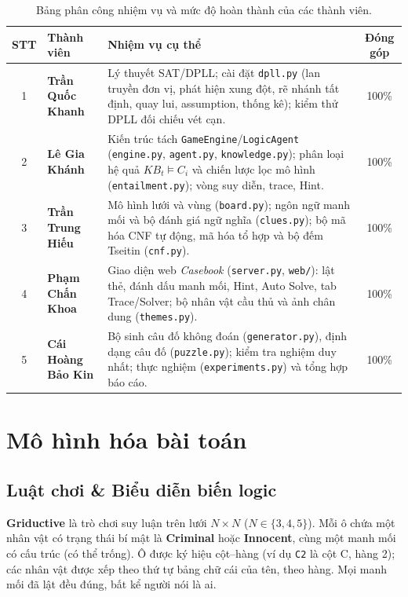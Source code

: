 \documentclass{article}
\newcommand{\code}[1]{\texttt{#1}}
\newcommand{\KB}{\mathit{KB}}
\begin{document}
\begin{table}[H]
\centering
\small
\renewcommand{\arraystretch}{1.3}
\begin{tabularx}{\textwidth}{|c|l|>{\raggedright\arraybackslash}X|c|}
\hline
\rowcolor{gray!20}
\textbf{STT} & \textbf{Thành viên} & \textbf{Nhiệm vụ cụ thể} & \textbf{Đóng góp} \\
\hline
1 & \textbf{Trần Quốc Khanh} & Lý thuyết SAT/DPLL; cài đặt \code{dpll.py} (lan truyền đơn vị, phát hiện xung đột, rẽ nhánh tất định, quay lui, assumption, thống kê); kiểm thử DPLL đối chiếu vét cạn. & 100\% \\
\hline
2 & \textbf{Lê Gia Khánh} & Kiến trúc tách \code{GameEngine}/\code{LogicAgent} (\code{engine.py}, \code{agent.py}, \code{knowledge.py}); phân loại hệ quả $\KB_t \models C_i$ và chiến lược lọc mô hình (\code{entailment.py}); vòng suy diễn, trace, Hint. & 100\% \\
\hline
3 & \textbf{Trần Trung Hiếu} & Mô hình lưới và vùng (\code{board.py}); ngôn ngữ manh mối và bộ đánh giá ngữ nghĩa (\code{clues.py}); bộ mã hóa CNF tự động, mã hóa tổ hợp và bộ đếm Tseitin (\code{cnf.py}). & 100\% \\
\hline
4 & \textbf{Phạm Chấn Khoa} & Giao diện web \textit{Casebook} (\code{server.py}, \code{web/}): lật thẻ, đánh dấu manh mối, Hint, Auto Solve, tab Trace/Solver; bộ nhân vật cầu thủ và ảnh chân dung (\code{themes.py}). & 100\% \\
\hline
5 & \textbf{Cái Hoàng Bảo Kin} & Bộ sinh câu đố không đoán (\code{generator.py}), định dạng câu đố (\code{puzzle.py}); kiểm tra nghiệm duy nhất; thực nghiệm (\code{experiments.py}) và tổng hợp báo cáo. & 100\% \\
\hline
\end{tabularx}
\caption{Bảng phân công nhiệm vụ và mức độ hoàn thành của các thành viên.}
\label{tab:phan_cong_cong_viec}
\end{table}

\section{Mô hình hóa bài toán}

\subsection{Luật chơi \& Biểu diễn biến logic}
\textbf{Griductive} là trò chơi suy luận trên lưới $N \times N$ ($N \in \{3,4,5\}$). Mỗi ô chứa một nhân vật có trạng thái bí mật là \textbf{Criminal} hoặc \textbf{Innocent}, cùng một manh mối có cấu trúc (có thể trống). Ô được ký hiệu cột--hàng (ví dụ \code{C2} là cột C, hàng 2); các nhân vật được xếp theo thứ tự bảng chữ cái của tên, theo hàng. Mọi manh mối đã lật đều đúng, bất kể người nói là ai.
\end{document}
